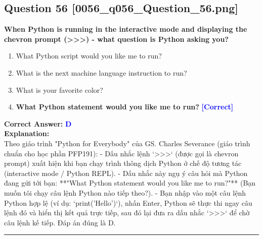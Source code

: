 \documentclass[11pt,a4paper]{article}
\begin{document}
\begin{minipage}{\textwidth}
\subsection*{Question 56 \quad \footnotesize{[0056_q056_Question_56.png]}}
\noindent \textbf{When Python is running in the interactive mode and displaying the chevron prompt (>>>) - what question is Python asking you?}

\begin{enumerate}[label=\Alph*.]
    \item What Python script would you like me to run?
    \item What is the next machine language instruction to run?
    \item What is your favorite color?
    \item \textbf{What Python statement would you like me to run?} \hfill \textcolor{blue}{\textbf{[Correct]}}
\end{enumerate}

\noindent \textbf{Correct Answer:} \textcolor{blue}{\textbf{D}} \\[4pt]
\noindent \textbf{Explanation:}\\
Theo giáo trình "Python for Everybody" của GS. Charles Severance (giáo trình chuẩn cho học phần PFP191):\newline
- Dấu nhắc lệnh `>>>` (được gọi là chevron prompt) xuất hiện khi bạn chạy trình thông dịch Python ở chế độ tương tác (interactive mode / Python REPL).\newline
- Dấu nhắc này ngụ ý câu hỏi mà Python đang gửi tới bạn: **"What Python statement would you like me to run?"** (Bạn muốn tôi chạy câu lệnh Python nào tiếp theo?).\newline
- Bạn nhập vào một câu lệnh Python hợp lệ (ví dụ: `print('Hello')`), nhấn Enter, Python sẽ thực thi ngay câu lệnh đó và hiển thị kết quả trực tiếp, sau đó lại đưa ra dấu nhắc `>>>` để chờ câu lệnh kế tiếp.\newline
Đáp án đúng là D.
\end{minipage}
\vspace{0.8cm}
\hrule
\vspace{0.5cm}
\end{document}
